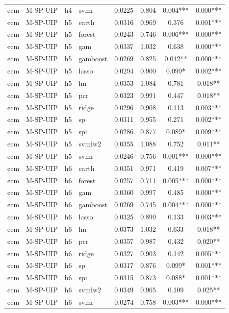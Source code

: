 \begin{ThreePartTable}
\begin{longtable}[t]{llclcccc}
ecm & M-SP-UIP & h4 & svmr & 0.0225 & 0.804 & 0.004*** & 0.000***\\
\addlinespace
ecm & M-SP-UIP & h5 & earth & 0.0316 & 0.969 & 0.376 & 0.001***\\
ecm & M-SP-UIP & h5 & forest & 0.0243 & 0.746 & 0.006*** & 0.000***\\
ecm & M-SP-UIP & h5 & gam & 0.0337 & 1.032 & 0.638 & 0.000***\\
ecm & M-SP-UIP & h5 & gamboost & 0.0269 & 0.825 & 0.042** & 0.000***\\
ecm & M-SP-UIP & h5 & lasso & 0.0294 & 0.900 & 0.099* & 0.002***\\
ecm & M-SP-UIP & h5 & lm & 0.0353 & 1.084 & 0.781 & 0.018**\\
ecm & M-SP-UIP & h5 & pcr & 0.0323 & 0.991 & 0.447 & 0.018**\\
ecm & M-SP-UIP & h5 & ridge & 0.0296 & 0.908 & 0.113 & 0.003***\\
ecm & M-SP-UIP & h5 & sp & 0.0311 & 0.955 & 0.271 & 0.002***\\
ecm & M-SP-UIP & h5 & spi & 0.0286 & 0.877 & 0.089* & 0.009***\\
ecm & M-SP-UIP & h5 & svmlw2 & 0.0355 & 1.088 & 0.752 & 0.011**\\
ecm & M-SP-UIP & h5 & svmr & 0.0246 & 0.756 & 0.001*** & 0.000***\\
\addlinespace
ecm & M-SP-UIP & h6 & earth & 0.0351 & 0.971 & 0.419 & 0.007***\\
ecm & M-SP-UIP & h6 & forest & 0.0257 & 0.711 & 0.005*** & 0.000***\\
ecm & M-SP-UIP & h6 & gam & 0.0360 & 0.997 & 0.485 & 0.000***\\
ecm & M-SP-UIP & h6 & gamboost & 0.0269 & 0.745 & 0.004*** & 0.000***\\
ecm & M-SP-UIP & h6 & lasso & 0.0325 & 0.899 & 0.133 & 0.003***\\
ecm & M-SP-UIP & h6 & lm & 0.0373 & 1.032 & 0.633 & 0.018**\\
ecm & M-SP-UIP & h6 & pcr & 0.0357 & 0.987 & 0.432 & 0.020**\\
ecm & M-SP-UIP & h6 & ridge & 0.0327 & 0.903 & 0.142 & 0.005***\\
ecm & M-SP-UIP & h6 & sp & 0.0317 & 0.876 & 0.099* & 0.001***\\
ecm & M-SP-UIP & h6 & spi & 0.0315 & 0.873 & 0.088* & 0.001***\\
ecm & M-SP-UIP & h6 & svmlw2 & 0.0349 & 0.965 & 0.109 & 0.025**\\
ecm & M-SP-UIP & h6 & svmr & 0.0274 & 0.758 & 0.003*** & 0.000***\\

\end{longtable}
\end{ThreePartTable}
